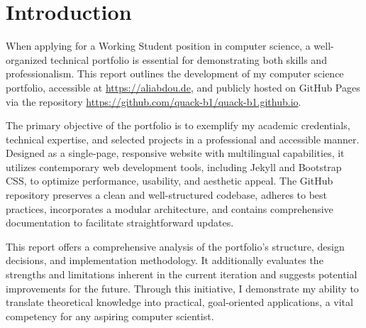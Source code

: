 \chapter{Introduction}
When applying for a Working Student position in computer science, a well-organized technical portfolio is essential for demonstrating both skills and professionalism. This report outlines the development of my computer science portfolio, accessible at \url{https://aliabdou.de}, and publicly hosted on GitHub Pages via the repository \url{https://github.com/quack-b1/quack-b1.github.io}.

The primary objective of the portfolio is to exemplify my academic credentials, technical expertise, and selected projects in a professional and accessible manner. Designed as a single-page, responsive website with multilingual capabilities, it utilizes contemporary web development tools, including Jekyll and Bootstrap CSS, to optimize performance, usability, and aesthetic appeal. The GitHub repository preserves a clean and well-structured codebase, adheres to best practices, incorporates a modular architecture, and contains comprehensive documentation to facilitate straightforward updates.

This report offers a comprehensive analysis of the portfolio's structure, design decisions, and implementation methodology. It additionally evaluates the strengths and limitations inherent in the current iteration and suggests potential improvements for the future. Through this initiative, I demonstrate my ability to translate theoretical knowledge into practical, goal-oriented applications, a vital competency for any aspiring computer scientist.  \par